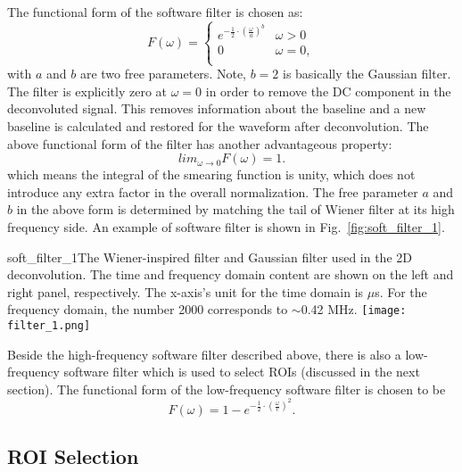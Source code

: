 The functional form of the software filter is chosen as:
\begin{equation}
F(\omega) = 
\begin{cases}
e^{- \frac{1}{2} \cdot \left( \frac{\omega}{a} \right)^b} &  \omega >0 \\
0 &  \omega = 0, \\
\end{cases}
\end{equation}
with $a$ and $b$ are two free parameters.  Note, $b=2$ is basically the Gaussian filter. 
The filter is explicitly zero at $\omega = 0$ in order to remove the DC component in the 
deconvoluted signal. This removes information about the baseline and a new baseline is 
calculated and restored for the waveform after deconvolution. The above functional form 
of the filter has another advantageous property:
\begin{equation}
lim_{\omega \rightarrow 0} F(\omega) = 1.
\end{equation}
which means the integral of the smearing function is unity, which does not introduce any
extra factor in the overall normalization. The free parameter $a$ and $b$ in the above 
form is determined by matching the tail of Wiener filter at its high frequency side. 
An example of software filter is shown in Fig.~\ref{fig:soft_filter_1}. 

\begin{cdrfigure}{soft_filter_1}{The Wiener-inspired filter and Gaussian filter used in the 2D deconvolution. 
The time and frequency domain content are shown on the left and right panel, respectively.
The x-axis's unit for the time domain is $\mu$s. For the frequency domain, the number 2000
corresponds to $\sim$0.42 MHz.}
\texttt{[image: filter\_1.png]}
\end{cdrfigure}

Beside the high-frequency software filter described above, there is also a low-frequency 
software filter which is used to select ROIs (discussed in the next section). 
The functional form of the low-frequency software filter is chosen to be 
\begin{equation}
F(\omega) = 1- e^{-\frac{1}{2}\cdot \left( \frac{\omega}{c} \right)^2}.
\end{equation}

\subsection{ROI Selection}

